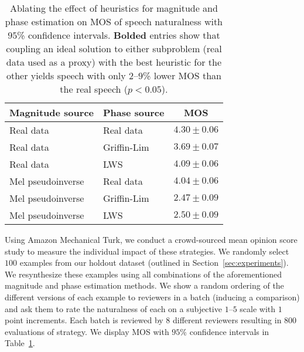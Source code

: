 \documentclass[a4paper]{article}
\begin{document}
\begin{table}[t]
\centering
\caption{Ablating the effect of heuristics for magnitude and phase estimation on MOS of speech naturalness with $95$\% confidence intervals.
\textbf{Bolded} entries show that coupling an ideal solution to either subproblem (real data used as a proxy) with the best heuristic for the other yields speech with only $2$--$9$\% lower MOS than the real speech ($p<0.05$).
}
\footnotesize
\begin{tabular}{llc}
\toprule
Magnitude source & Phase source & MOS \\
\midrule
Real data & Real data & $4.30 \pm 0.06$ \\
Real data & Griffin-Lim & $3.69 \pm 0.07$ \\
Real data & LWS & $\mathbf{4.09 \pm 0.06}$  \\
Mel pseudoinverse & Real data & $\mathbf{4.04 \pm 0.06}$ \\
Mel pseudoinverse & Griffin-Lim & $2.47 \pm 0.09$ \\
Mel pseudoinverse & LWS & $2.50 \pm 0.09$  \\
\bottomrule
\end{tabular}
\label{tab:gl}
\end{table}

Using Amazon Mechanical Turk, we conduct a crowd-sourced mean opinion score study to measure the individual impact of these strategies. 
We randomly select $100$ examples from our holdout dataset (outlined in Section~\ref{sec:experiments}). 
We resynthesize these examples using all combinations of the aforementioned magnitude and phase estimation methods. 
We show a random ordering of the different versions of each example to reviewers in a batch (inducing a comparison) and ask them to rate the naturalness of each on a subjective $1$--$5$ scale with $1$ point increments. 
Each batch is reviewed by $8$ different reviewers resulting in $800$ evaluations of strategy. 
We display MOS with $95$\% confidence intervals in Table~\ref{tab:gl}.
\end{document}

